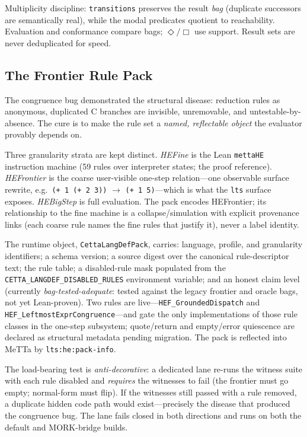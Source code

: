 \documentclass[11pt]{article}
\newcommand{\code}[1]{\texttt{#1}}
\begin{document}
Multiplicity discipline: \code{transitions} preserves the result
\emph{bag} (duplicate successors are semantically real), while the
modal predicates quotient to reachability.  Evaluation and conformance
compare bags; $\Diamond/\Box$ use support.  Result sets are never
deduplicated for speed.

\subsection{The Frontier Rule Pack}
\label{sec:langdefpack}

The congruence bug demonstrated the structural disease: reduction
rules as anonymous, duplicated C branches are invisible, unremovable,
and untestable-by-absence.  The cure is to make the rule set a
\emph{named, reflectable object} the evaluator provably depends on.

Three granularity strata are kept distinct.  \emph{HEFine} is the Lean
\code{mettaHE} instruction machine (59 rules over interpreter states;
the proof reference).  \emph{HEFrontier} is the coarse user-visible
one-step relation---one observable surface rewrite, e.g.\
\code{(+ 1 (+ 2 3))} $\to$ \code{(+ 1 5)}---which is what the
\code{lts} surface exposes.  \emph{HEBigStep} is full evaluation.  The
pack encodes HEFrontier; its relationship to the fine machine is a
collapse/simulation with explicit provenance links (each coarse rule
names the fine rules that justify it), never a label identity.

The runtime object, \code{CettaLangDefPack}, carries: language,
profile, and granularity identifiers; a schema version; a source
digest over the canonical rule-descriptor text; the rule table; a
disabled-rule mask populated from the
\code{CETTA\_LANGDEF\_DISABLED\_RULES} environment variable; and an
honest claim level (currently \emph{bag-tested-adequate}: tested
against the legacy frontier and oracle bags, not yet Lean-proven).
Two rules are live---\code{HEF\_GroundedDispatch} and
\code{HEF\_LeftmostExprCongruence}---and gate the only implementations
of those rule classes in the one-step subsystem; quote/return and
empty/error quiescence are declared as structural metadata pending
migration.  The pack is reflected into MeTTa by
\code{lts:he:pack-info}.

The load-bearing test is \emph{anti-decorative}: a dedicated lane
re-runs the witness suite with each rule disabled and \emph{requires}
the witnesses to fail (the frontier must go empty; normal-form must
flip).  If the witnesses still passed with a rule removed, a duplicate
hidden code path would exist---precisely the disease that produced the
congruence bug.  The lane fails closed in both directions and runs on
both the default and MORK-bridge builds.
\end{document}
